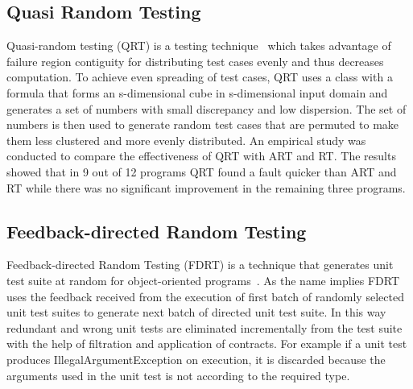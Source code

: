 \subsection{Quasi Random Testing}
Quasi-random testing (QRT) is a testing technique~\cite{chen2007quasi} which takes advantage of failure region contiguity for distributing test cases evenly and thus decreases computation. %
To achieve even spreading of test cases, QRT uses a class with a formula that forms an s-dimensional cube in s-dimensional input domain and generates a set of numbers with small discrepancy and low dispersion. The set of numbers is then used to generate random test cases that are permuted to make them less clustered and more evenly distributed. An empirical study was conducted to compare the effectiveness of QRT with ART and RT. The results showed that in 9 out of 12 programs QRT found a fault quicker than ART and RT while there was no significant improvement in the remaining three programs.


\subsection{Feedback-directed Random Testing}
Feedback-directed Random Testing (FDRT) is a technique that generates unit test suite at random for object-oriented programs~\cite{pacheco2007randoop}. As the name implies FDRT uses the feedback received from the execution of first batch of randomly selected unit test suites to generate next batch of directed unit test suite. In this way redundant  and wrong unit tests are eliminated incrementally from the test suite with the help of filtration and application of contracts. For example if a unit test produces IllegalArgumentException on execution, it is discarded because the arguments used in the unit test is not according to the required type. 

